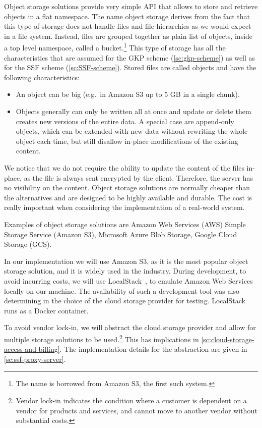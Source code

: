 Object storage solutions provide
very simple API that allows to store and retrieve
objects in a flat namespace.
The name object storage derives from the fact that this type
of storage does not handle files and file hierarchies 
as we would expect in a file system. Instead,
files are grouped together as plain list of objects,
inside a top level namespace, called a bucket.\footnote{The name is borrowed from Amazon S3, the first such system.}
This type of storage has all the characteristics that are assumed
for the GKP scheme (\cref{sc:gkp-scheme}) as well as for the SSF scheme (\cref{sc:SSF-scheme}).
Stored files are called objects and have the following characteristics:
\begin{itemize}
    \item An object can be big (e.g.\ in Amazon S3 up to 5 GB in a single chunk).
    \item Objects generally can only be written all at once and update or delete them creates new versions of the entire data. A special case are append-only objects, which can be extended with new data without rewriting the whole object each time, but still disallow in-place modifications of the existing content.
\end{itemize} 

We notice that we do not require the ability to update the content of the files in-place,
as the file is always sent encrypted by the client. Therefore, the server has no visibility 
on the content.
Object storage solutions are normally cheaper than the alternatives
and are designed to be highly available and durable.
The cost is really important when considering the implementation
of a real-world system.

Examples of object storage solutions are Amazon Web Services (AWS)
Simple Storage Service (Amazon S3), Microsoft Azure Blob Storage, Google Cloud Storage (GCS).

In our implementation we will use Amazon S3, as it is the most
popular object storage solution, and it is widely used in the industry.
During development, to avoid incurring costs, we will use LocalStack~\cite{LocalStack},
to emulate Amazon Web Services locally on our machine. The availability
of such a development tool was also determining in the choice
of the cloud storage provider for testing. LocalStack
runs as a Docker container.

To avoid vendor lock-in, we will abstract the cloud storage provider
and allow for multiple storage solutions to be used.\footnote{Vendor lock-in indicates the condition where a customer is dependent on a vendor for products and services, and cannot move to another vendor without substantial costs.}
This has implications in \cref{sc:cloud-storage-access-and-billing}.
The implementation details for the abstraction are given in \cref{sc:ssf-proxy-server}.


